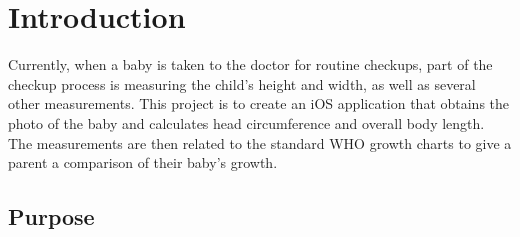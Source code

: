\documentclass[letterpaper,10pt,draftclsnofoot,onecolumn,compsoc]{IEEEtran}
\begin{document}
\section{Introduction}
\begin{singlespace}
\noindent
Currently, when a baby is taken to the doctor for routine checkups, part of the checkup process is measuring the child's height and width, as well as several other measurements. This project is to create an iOS application that obtains the photo of the baby and calculates head circumference and overall body length. The measurements are then related to the standard WHO growth charts to give a parent a comparison of their baby's growth.
\end{singlespace}

\subsection{Purpose}
\end{document}
